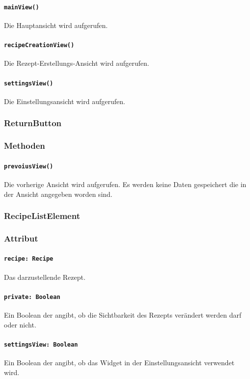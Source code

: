 \documentclass[parskip=full]{scrartcl}
\begin{document}
            \paragraph*{\texttt{mainView()}} Die Hauptansicht wird aufgerufen.
            \paragraph*{\texttt{recipeCreationView()}} Die Rezept-Erstellungs-Ansicht wird aufgerufen.
            \paragraph*{\texttt{settingsView()}} Die Einstellungsansicht wird aufgerufen.

    \subsubsection{ReturnButton} \label{sec:ReturnButton} 
        \subsubsection*{Methoden}
            \paragraph*{\texttt{prevoiusView()}} Die vorherige Ansicht wird aufgerufen. Es werden keine Daten gespeichert die in der Ansicht angegeben worden sind.
    
    \subsubsection{RecipeListElement} \label{sec:RecipeListElement}
        \subsubsection*{Attribut}
            \paragraph*{\texttt{recipe: Recipe}} Das darzustellende Rezept.
            \paragraph*{\texttt{private: Boolean}} Ein Boolean der angibt, ob die Sichtbarkeit des Rezepts verändert werden darf oder nicht.
            \paragraph*{\texttt{settingsView: Boolean}} Ein Boolean der angibt, ob das Widget in der Einstellungsansicht verwendet wird.
\end{document}
